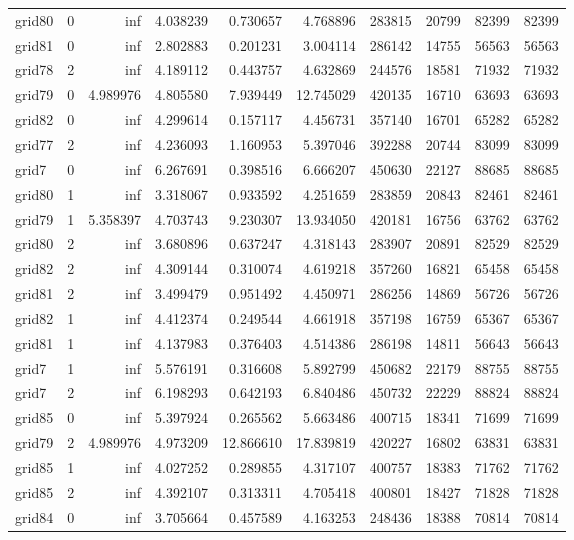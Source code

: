 \begin{longtable}{|l|r|r|r|r|r|r|r|r|r|}
grid80 & 0 & inf & 4.038239 & 0.730657 & 4.768896 & 283815 & 20799 & 82399 & 82399 \\
grid81 & 0 & inf & 2.802883 & 0.201231 & 3.004114 & 286142 & 14755 & 56563 & 56563 \\
grid78 & 2 & inf & 4.189112 & 0.443757 & 4.632869 & 244576 & 18581 & 71932 & 71932 \\
grid79 & 0 & 4.989976 & 4.805580 & 7.939449 & 12.745029 & 420135 & 16710 & 63693 & 63693 \\
grid82 & 0 & inf & 4.299614 & 0.157117 & 4.456731 & 357140 & 16701 & 65282 & 65282 \\
grid77 & 2 & inf & 4.236093 & 1.160953 & 5.397046 & 392288 & 20744 & 83099 & 83099 \\
grid7 & 0 & inf & 6.267691 & 0.398516 & 6.666207 & 450630 & 22127 & 88685 & 88685 \\
grid80 & 1 & inf & 3.318067 & 0.933592 & 4.251659 & 283859 & 20843 & 82461 & 82461 \\
grid79 & 1 & 5.358397 & 4.703743 & 9.230307 & 13.934050 & 420181 & 16756 & 63762 & 63762 \\
grid80 & 2 & inf & 3.680896 & 0.637247 & 4.318143 & 283907 & 20891 & 82529 & 82529 \\
grid82 & 2 & inf & 4.309144 & 0.310074 & 4.619218 & 357260 & 16821 & 65458 & 65458 \\
grid81 & 2 & inf & 3.499479 & 0.951492 & 4.450971 & 286256 & 14869 & 56726 & 56726 \\
grid82 & 1 & inf & 4.412374 & 0.249544 & 4.661918 & 357198 & 16759 & 65367 & 65367 \\
grid81 & 1 & inf & 4.137983 & 0.376403 & 4.514386 & 286198 & 14811 & 56643 & 56643 \\
grid7 & 1 & inf & 5.576191 & 0.316608 & 5.892799 & 450682 & 22179 & 88755 & 88755 \\
grid7 & 2 & inf & 6.198293 & 0.642193 & 6.840486 & 450732 & 22229 & 88824 & 88824 \\
grid85 & 0 & inf & 5.397924 & 0.265562 & 5.663486 & 400715 & 18341 & 71699 & 71699 \\
grid79 & 2 & 4.989976 & 4.973209 & 12.866610 & 17.839819 & 420227 & 16802 & 63831 & 63831 \\
grid85 & 1 & inf & 4.027252 & 0.289855 & 4.317107 & 400757 & 18383 & 71762 & 71762 \\
grid85 & 2 & inf & 4.392107 & 0.313311 & 4.705418 & 400801 & 18427 & 71828 & 71828 \\
grid84 & 0 & inf & 3.705664 & 0.457589 & 4.163253 & 248436 & 18388 & 70814 & 70814 \\

\end{longtable}
